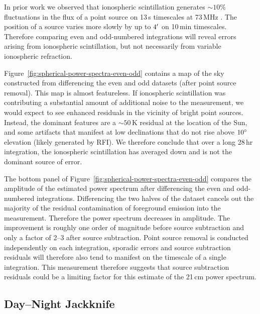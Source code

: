 \documentclass[twocolumn]{aastex62}
\begin{document}
In prior work we observed that ionospheric scintillation generates $\sim10\%$ fluctuations in the
flux of a point source on 13\,s timescales at 73\,MHz \citep{2018AJ....156...32E}. The position of a
source varies more slowly by up to $4\mbox{$^\prime$}$ on 10\,min timescales. Therefore comparing even and
odd-numbered integrations will reveal errors arising from ionospheric scintillation, but not
necessarily from variable ionospheric refraction.

Figure~\ref{fig:spherical-power-spectra-even-odd} contains a map of the sky constructed from
differencing the even and odd datasets (after point source removal).  This map is almost
featureless. If ionospheric scintillation was contributing a substantial amount of additional noise
to the measurement, we would expect to see enhanced residuals in the vicinity of bright point
sources. Instead, the dominant features are a $\sim50\,\text{K}$ residual at the location of the
Sun, and some artifacts that manifest at low declinations that do not rise above $10\mbox{$^\circ$}$
elevation (likely generated by RFI). We therefore conclude that over a long 28\,hr integration, the
ionospheric scintillation has averaged down and is not the dominant source of error.

The bottom panel of Figure~\ref{fig:spherical-power-spectra-even-odd} compares the amplitude of the
estimated power spectrum after differencing the even and odd-numbered integrations. Differencing the
two halves of the dataset cancels out the majority of the residual contamination of foreground
emission into the measurement. Therefore the power spectrum decreases in amplitude. The improvement
is roughly one order of magnitude before source subtraction and only a factor of 2--3 after source
subtraction. Point source removal is conducted independently on each integration, sporadic errors
and source subtraction residuals will therefore also tend to manifest on the timescale of a single
integration. This measurement therefore suggests that source subtraction residuals could be a
limiting factor for this estimate of the 21\,cm power spectrum.

\subsection{Day--Night Jackknife}
\end{document}
